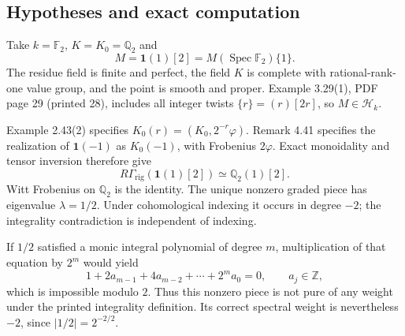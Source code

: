 \documentclass[10pt]{article}
\begin{document}
\subsection*{Hypotheses and exact computation}
Take \(k=\mathbb F_2\), \(K=K_0=\mathbb Q_2\) and \[M=\mathbf 1(1)[2]=M(\operatorname{Spec}\mathbb F_2)\{1\}.\] The residue field is finite and perfect, the field \(K\) is complete with rational-rank-one value group, and the point is smooth and proper. Example 3.29(1), PDF page 29 (printed 28), includes all integer twists \(\{r\}=(r)[2r]\), so \(M\in\mathcal H_k\).\par
Example 2.43(2) specifies \(K_0(r)=(K_0,2^{-r}\varphi)\). Remark 4.41 specifies the realization of \(\mathbf 1(-1)\) as \(K_0(-1)\), with Frobenius \(2\varphi\). Exact monoidality and tensor inversion therefore give \[R\Gamma_{\mathrm{rig}}(\mathbf 1(1)[2])\simeq \mathbb Q_2(1)[2].\] Witt Frobenius on \(\mathbb Q_2\) is the identity. The unique nonzero graded piece has eigenvalue \(\lambda=1/2\). Under cohomological indexing it occurs in degree \(-2\); the integrality contradiction is independent of indexing.\par
If \(1/2\) satisfied a monic integral polynomial of degree \(m\), multiplication of that equation by \(2^m\) would yield \[1+2a_{m-1}+4a_{m-2}+\cdots+2^m a_0=0,\qquad a_j\in\mathbb Z,\] which is impossible modulo \(2\). Thus this nonzero piece is not pure of any weight under the printed integrality definition. Its correct spectral weight is nevertheless \(-2\), since \(|1/2|=2^{-2/2}\).\par
\end{document}

